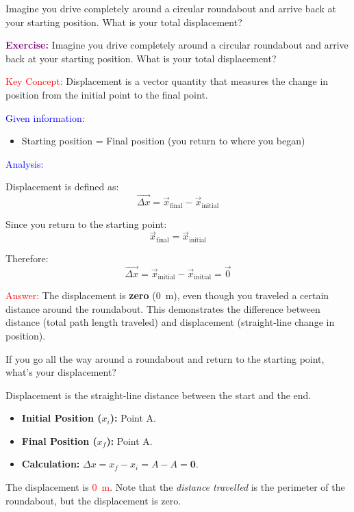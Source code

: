 \begin{exercise}
    Imagine you drive completely around a circular roundabout and arrive back at your starting position. What is your total displacement?
    \begin{solu}
        \textbf{\textcolor{purple}{Exercise:}} Imagine you drive completely around a circular roundabout and arrive back at your starting position. What is your total displacement?

        \vspace{0.3cm}

        \textcolor{red}{Key Concept:} Displacement is a vector quantity that measures the change in position from the initial point to the final point.

        \textcolor{blue}{Given information:}
        \begin{itemize}
            \item Starting position = Final position (you return to where you began)
        \end{itemize}

        \textcolor{blue}{Analysis:}

        Displacement is defined as:
        \[
            \vec{\Delta x} = \vec{x}_{\text{final}} - \vec{x}_{\text{initial}}
        \]

        Since you return to the starting point:
        \[
            \vec{x}_{\text{final}} = \vec{x}_{\text{initial}}
        \]

        Therefore:
        \[
            \vec{\Delta x} = \vec{x}_{\text{initial}} - \vec{x}_{\text{initial}} = \vec{0}
        \]

        \textcolor{red}{Answer:} The displacement is \textbf{zero} (\qty{0}{\m}), even though you traveled a certain distance around the roundabout. This demonstrates the difference between distance (total path length traveled) and displacement (straight-line change in position).
    \end{solu}
\end{exercise}

\begin{exercise}
    If you go all the way around a roundabout and return to the starting point, what’s your displacement?
    \begin{solu}
        Displacement is the straight-line distance between the start and the end.
        \begin{itemize}
            \item \textbf{Initial Position ($x_i$):} Point A.
            \item \textbf{Final Position ($x_f$):} Point A.
            \item \textbf{Calculation:} $\Delta x = x_f - x_i = A - A = \mathbf{0}$.
        \end{itemize}
        The displacement is \textcolor{red}{\qty{0}{\m}}. Note that the \textit{distance travelled} is the perimeter of the roundabout, but the displacement is zero.
    \end{solu}
\end{exercise}



